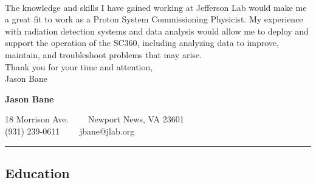 \documentclass[12pt,letterpaper]{article}
\begin{document}
	\paragraph{}The knowledge and skills I have gained working at Jefferson Lab would make me a great fit to work as a Proton System Commissioning Physicist. My experience with radiation detection systems and data analysis would allow me to deploy and support the operation of the SC360, including analyzing data to improve, maintain, and troubleshoot problems that may arise. 
	\\
	
	\noindent Thank you for your time and attention,\\
	\noindent Jason Bane


%
\newpage

\begin{center}
{\LARGE \textbf{Jason Bane}}

18 Morrison Ave.\ \ \textbullet
\ \ Newport News, VA 23601 \\
(931) 239-0611\ \ \textbullet
\ \ jbane@jlab.org
\end{center}

\hrule
\vspace{-0.4em}
\subsection*{Education}
\end{document}
